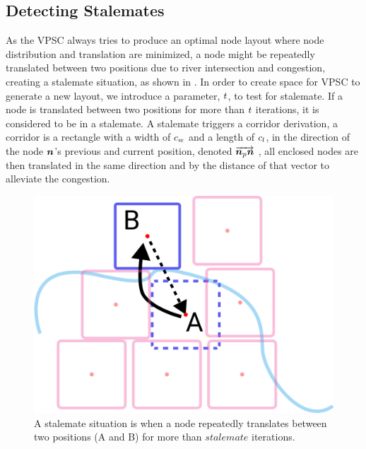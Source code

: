 \subsection{Detecting Stalemates}

As the VPSC always tries to produce an optimal node layout where node distribution and translation are minimized, a node might be repeatedly translated between two positions due to river intersection and congestion, creating a stalemate situation, as shown in . In order to create space for VPSC to generate a new layout, we introduce a parameter, $ t $, to test for stalemate. If a node is translated between two positions for more than $ t $ iterations, it is considered to be in a stalemate. A stalemate triggers a corridor derivation, {a corridor is a rectangle with a width of $ c_w $ and a length of $ c_l $, in the direction of the node $ \bm{n} $'s previous and current position, denoted $ \protect\overrightarrow{\bm{n}_{p}\bm{n}} $ }, all enclosed nodes are then translated in the same direction and by the distance of that vector to alleviate the congestion.

{
\begin{figure}[tb!]
    \centering
    \includegraphics[width=\columnwidth]{figure/stalemate.png}
    \caption{A stalemate situation is when a node repeatedly translates between two positions (A and B) for more than $ stalemate $ iterations. }
    \label{fig:stalemate}
\end{figure}
}

